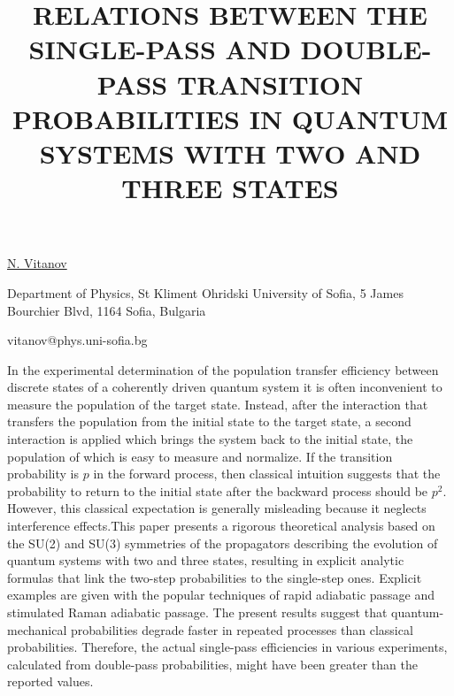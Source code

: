 \title{RELATIONS BETWEEN THE SINGLE-PASS AND DOUBLE-PASS TRANSITION PROBABILITIES IN QUANTUM SYSTEMS WITH TWO AND THREE STATES}

\underline{N. Vitanov} 

{\normalsize{\vspace{-4mm}
Department of Physics, St Kliment Ohridski University of Sofia, 5 James Bourchier Blvd, 1164 Sofia, Bulgaria



\email vitanov@phys.uni-sofia.bg}}

In the experimental determination of the population transfer efficiency between discrete states of a coherently driven quantum system it is often inconvenient to measure the population of the target state. Instead, after the interaction that transfers the population from the initial state to the target state, a second interaction is applied which brings the system back to the initial state, the population of which is easy to measure and normalize. If the transition probability is $p$ in the forward process, then classical intuition suggests that the probability to return to the initial state after the backward process should be $p^2$. However, this classical expectation is generally misleading because it neglects interference effects.This paper presents a rigorous theoretical analysis based on the SU(2) and SU(3) symmetries of the propagators describing the evolution of quantum systems with two and three states, resulting in explicit analytic formulas that link the two-step probabilities to the single-step ones. Explicit examples are given with the popular techniques of rapid adiabatic passage and stimulated Raman adiabatic passage. The present results suggest that quantum-mechanical probabilities degrade faster in repeated processes than classical probabilities. Therefore, the actual single-pass efficiencies in various experiments, calculated from double-pass probabilities, might have been greater than the reported values.

\vspace{\baselineskip} 